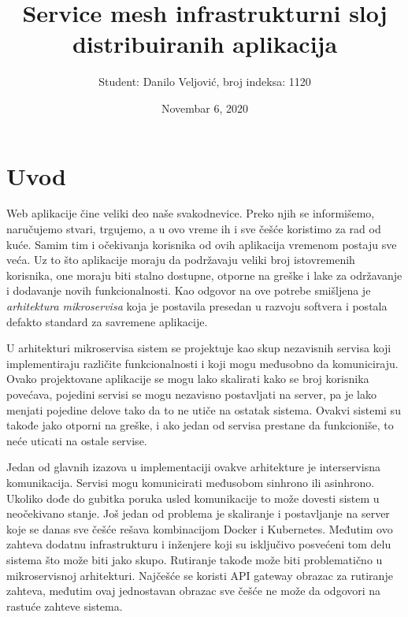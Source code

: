 \documentclass[a4paper,12pt]{report}
\begin{document}

\title{\Large{\textbf{Service mesh infrastrukturni sloj distribuiranih aplikacija }}}
\author{Student: Danilo Veljović, broj indeksa: 1120}
\date{Novembar 6, 2020}
\maketitle
\let\cleardoublepage\clearpage
\tableofcontents


\setcounter{page}{1}

\chapter{Uvod}

Web aplikacije čine veliki deo naše svakodnevice. Preko njih se informišemo, naručujemo stvari, trgujemo, a u ovo vreme ih i sve češće koristimo za rad od kuće. Samim tim i očekivanja korisnika od ovih aplikacija vremenom postaju sve veća. Uz to što aplikacije moraju da podržavaju veliki broj istovremenih korisnika, one moraju biti stalno dostupne, otporne na greške i lake za održavanje i dodavanje novih funkcionalnosti. Kao odgovor na ove potrebe smišljena je \textit{arhitektura mikroservisa} koja je postavila presedan u razvoju softvera i postala defakto standard za savremene aplikacije. \newline

U arhitekturi mikroservisa sistem se projektuje kao skup nezavisnih servisa koji implementiraju različite funkcionalnosti i koji mogu međusobno da komuniciraju.  Ovako projektovane aplikacije se mogu lako skalirati kako se broj korisnika povećava, pojedini servisi se mogu nezavisno postavljati na server, pa je lako menjati pojedine delove tako da to ne utiče na ostatak sistema. Ovakvi sistemi su takođe jako otporni na greške, i ako jedan od servisa prestane da funkcioniše, to neće uticati na ostale servise.  \newline

Jedan od glavnih izazova u implementaciji ovakve arhitekture je interservisna komunikacija. Servisi mogu komunicirati međusobom sinhrono ili asinhrono. Ukoliko dođe do gubitka poruka usled komunikacije to može dovesti sistem u neočekivano stanje. Još jedan od problema je skaliranje i postavljanje na server koje se danas sve češće rešava kombinacijom Docker i Kubernetes. Međutim ovo zahteva dodatnu infrastrukturu i inženjere koji su isključivo posvećeni tom delu sistema što može biti jako skupo. Rutiranje takođe može biti problematično u mikroservisnoj arhitekturi. Najčešće se koristi API gateway obrazac za rutiranje zahteva, međutim ovaj jednostavan obrazac sve češće ne može da odgovori na rastuće zahteve sistema. \newline
\end{document}
